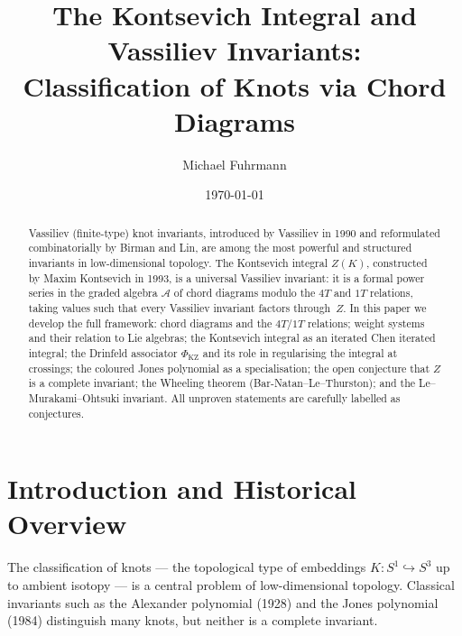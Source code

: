 \documentclass[12pt,a4paper]{amsart}
\theoremstyle{definition}
\begin{document}

\title{The Kontsevich Integral and Vassiliev Invariants:\\
       Classification of Knots via Chord Diagrams}

\author{Michael Fuhrmann}
\address{Specialist Mathematics Project, Build 170}
\date{\today}

\begin{abstract}
Vassiliev (finite-type) knot invariants, introduced by Vassiliev in 1990 and
reformulated combinatorially by Birman and Lin, are among the most powerful
and structured invariants in low-dimensional topology.  The Kontsevich
integral $Z(K)$, constructed by Maxim Kontsevich in 1993, is a universal
Vassiliev invariant: it is a formal power series in the graded algebra $\mathcal{A}$
of chord diagrams modulo the $4T$ and $1T$ relations, taking values such that
every Vassiliev invariant factors through~$Z$.  In this paper we develop
the full framework: chord diagrams and the $4T$/$1T$ relations; weight systems
and their relation to Lie algebras; the Kontsevich integral as an iterated
Chen iterated integral; the Drinfeld associator $\Phi_{\mathrm{KZ}}$ and its
role in regularising the integral at crossings; the coloured Jones polynomial
as a specialisation; the open conjecture that $Z$ is a complete invariant;
the Wheeling theorem (Bar-Natan--Le--Thurston); and the Le--Murakami--Ohtsuki
invariant.  All unproven statements are carefully labelled as conjectures.
\end{abstract}

\maketitle

\tableofcontents

\section{Introduction and Historical Overview}

The classification of knots --- the topological type of embeddings
$K: S^1 \hookrightarrow S^3$ up to ambient isotopy --- is a central
problem of low-dimensional topology.  Classical invariants such as the
Alexander polynomial (1928) and the Jones polynomial (1984) distinguish
many knots, but neither is a complete invariant.
\end{document}
